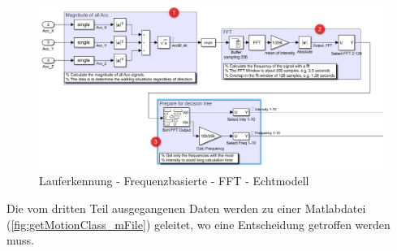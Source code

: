 \begin{figure}[H]
	\centering
	\includegraphics[width=\linewidth]{Bilder/Lauferkennung_Modell_1_1.png}
	\caption{Lauferkennung - Frequenzbasierte - FFT - Echtmodell}
	\label{fig:Lauferkennung_Freqbasiert_FFT_Echtmodell}
\end{figure}

Die vom dritten Teil ausgegangenen Daten werden zu einer Matlabdatei (\autoref{fig:getMotionClass_mFile}) geleitet, wo eine Entscheidung getroffen werden muss.
%
%
%

